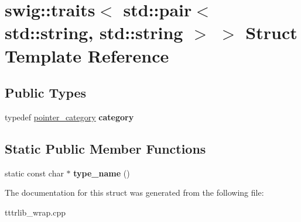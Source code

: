 \hypertarget{structswig_1_1traits_3_01std_1_1pair_3_01std_1_1string_00_01std_1_1string_01_4_01_4}{}\section{swig\+:\+:traits$<$ std\+:\+:pair$<$ std\+:\+:string, std\+:\+:string $>$ $>$ Struct Template Reference}
\label{structswig_1_1traits_3_01std_1_1pair_3_01std_1_1string_00_01std_1_1string_01_4_01_4}
\subsection*{Public Types}
\begin{DoxyCompactItemize}
\item 
\mbox{\label{structswig_1_1traits_3_01std_1_1pair_3_01std_1_1string_00_01std_1_1string_01_4_01_4_a554d795b938a3c16d9da06d08fe3ea39}} 
typedef \hyperlink{structswig_1_1pointer__category}{pointer\+\_\+category} {\bfseries category}
\end{DoxyCompactItemize}
\subsection*{Static Public Member Functions}
\begin{DoxyCompactItemize}
\item 
\mbox{\label{structswig_1_1traits_3_01std_1_1pair_3_01std_1_1string_00_01std_1_1string_01_4_01_4_a23e51c7a800e60e4893c2c1f47e32d76}} 
static const char $\ast$ {\bfseries type\+\_\+name} ()
\end{DoxyCompactItemize}


The documentation for this struct was generated from the following file\+:\begin{DoxyCompactItemize}
\item 
tttrlib\+\_\+wrap.\+cpp\end{DoxyCompactItemize}
